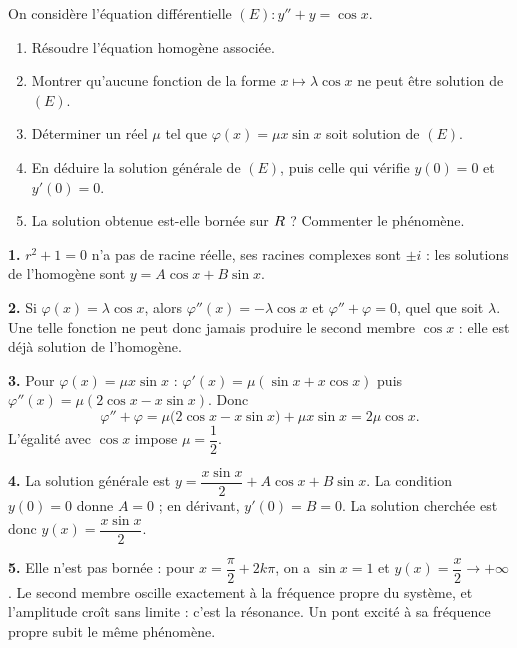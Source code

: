 \begin{concours}
On considère l'équation différentielle $(E) : y'' + y = \cos x$.

\begin{enumerate}[label=\textbf{\arabic*.}, leftmargin=*, itemsep=0.25em]
  \item Résoudre l'équation homogène associée.
  \item Montrer qu'aucune fonction de la forme $x \mapsto \lambda\cos x$ ne
        peut être solution de $(E)$.
  \item Déterminer un réel $\mu$ tel que
        $\varphi(x) = \mu x\sin x$ soit solution de $(E)$.
  \item En déduire la solution générale de $(E)$, puis celle qui vérifie
        $y(0) = 0$ et $y'(0) = 0$.
  \item La solution obtenue est-elle bornée sur $R$ ? Commenter le phénomène.
\end{enumerate}
\end{concours}

\begin{corrige}
\textbf{1.} $r^{2}+1 = 0$ n'a pas de racine réelle, ses racines complexes sont
$\pm i$ : les solutions de l'homogène sont
$y = A\cos x + B\sin x$.

\textbf{2.} Si $\varphi(x) = \lambda\cos x$, alors
$\varphi''(x) = -\lambda\cos x$ et $\varphi''+\varphi = 0$, quel que soit
$\lambda$. Une telle fonction ne peut donc jamais produire le second membre
$\cos x$ : elle est déjà solution de l'homogène.

\textbf{3.} Pour $\varphi(x) = \mu x\sin x$ :
$\varphi'(x) = \mu(\sin x + x\cos x)$ puis
$\varphi''(x) = \mu(2\cos x - x\sin x)$. Donc
\[
  \varphi''+\varphi = \mu\bigl(2\cos x - x\sin x\bigr) + \mu x\sin x
                    = 2\mu\cos x .
\]
L'égalité avec $\cos x$ impose $\mu = \dfrac12$.

\textbf{4.} La solution générale est
$y = \dfrac{x\sin x}{2} + A\cos x + B\sin x$. La condition $y(0) = 0$ donne
$A = 0$ ; en dérivant, $y'(0) = B = 0$. La solution cherchée est donc
$y(x) = \dfrac{x\sin x}{2}$.

\textbf{5.} Elle n'est pas bornée : pour $x = \dfrac{\pi}{2}+2k\pi$, on a
$\sin x = 1$ et $y(x) = \dfrac{x}{2} \to +\infty$. Le second membre oscille
exactement à la fréquence propre du système, et l'amplitude croît sans limite :
c'est la résonance. Un pont excité à sa fréquence propre subit le même
phénomène.
\end{corrige}


